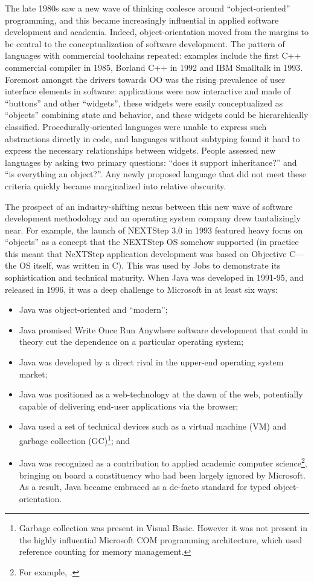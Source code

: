 \documentclass[acmsmall]{acmart}\settopmatter{}
\begin{document}
The late 1980s saw a new wave of thinking coalesce around “object-oriented” programming, and this became increasingly
influential in applied software development and academia.  Indeed, object-orientation moved from the margins to be central
to the conceptualization of software development.  The pattern of languages with commercial toolchains repeated:
examples include the first C++ commercial compiler in 1985, Borland C++ in 1992 and IBM Smalltalk in 1993.   Foremost
amongst the drivers towards OO was the rising prevalence of user interface elements in software: applications were
now interactive and made of “buttons” and other “widgets”, these widgets were easily conceptualized as “objects” combining
state and behavior, and these widgets could be hierarchically classified. Procedurally-oriented languages were unable
to express such abstractions directly in code, and languages without subtyping found it hard to express the necessary
relationships between widgets. People assessed new languages by asking two primary questions: “does it support inheritance?”
and “is everything an object?”.  Any newly proposed language that did not meet these criteria quickly became marginalized into relative obscurity. 

The prospect of an industry-shifting nexus between this new wave of software development methodology and an
operating system company drew tantalizingly near. For example, the launch of NEXTStep 3.0 in 1993 featured heavy
focus on “objects” as a concept that the NEXTStep OS somehow supported (in practice this meant that NeXTStep application
development was based on Objective C---the OS itself, was written in C). This was used by Jobs to demonstrate its
sophistication and technical maturity. When Java was developed in 1991-95, and released in 1996, it was a deep challenge to Microsoft in at least six ways: 
\begin{itemize}
\item Java was object-oriented and “modern”;
\item Java promised Write Once Run Anywhere software development that could in theory cut the dependence on a particular operating system; 
\item Java was developed by a direct rival in the upper-end operating system market; 
\item Java was positioned as a web-technology at the dawn of the web, potentially capable of delivering end-user applications via the browser;
\item Java used a set of technical devices such as a virtual machine (VM) and garbage collection (GC)\footnote{Garbage collection was present in Visual Basic. However it was not present in the highly influential Microsoft COM programming architecture, which used reference counting for memory management.};  and 
\item Java was recognized as a contribution to applied academic computer science\footnote{For example, \citep{AlvesFoss1999}.}, bringing on board a constituency who had been largely ignored by Microsoft. As a result, Java became embraced as a de-facto standard for typed object-orientation.
\end{itemize}
\end{document}
